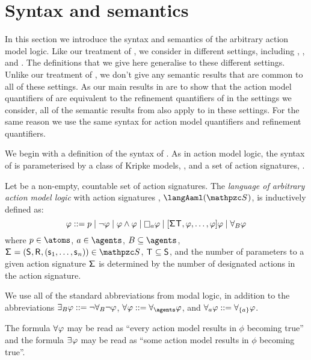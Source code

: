 \section{Syntax and semantics}\label{aaml-semantics}

In this section we introduce the syntax and semantics of the arbitrary action model logic.
Like our treatment of \logicRml{}, we consider \logicAaml{} in different settings, including \classK{}, \classKFF{}, and \classS{}.
The definitions that we give here generalise to these different settings.
Unlike our treatment of \logicRml{}, we don't give any semantic results that are common to all of these settings.
As our main results in \logicAaml{} are to show that the action model quantifiers of \logicAaml{} are equivalent to the refinement quantifiers of \logicRml{} in the settings we consider, all of the semantic results from \logicRml{} also apply to \logicAaml{} in these settings.
For the same reason we use the same syntax for action model quantifiers and refinement quantifiers.

We begin with a definition of the syntax of \logicAaml{}.
As in action model logic, the syntax of \logicAaml{} is parameterised by a class of Kripke models, \classC{}, and a set of action signatures, \aSignatureFamily{}.

\begin{definition}
Let \aSignatureFamily{} be a non-empty, countable set of action signatures.
The {\em language of arbitrary action model logic} with action signatures \aSignatureFamily{}, $\langAaml(\aSignatureFamily)$, is inductively defined as:
$$
\phi ::= 
    \atomP \mid
    \lnot \phi \mid
    \phi \land \phi \mid
    \necessaryA \phi \mid
    \actionA{\aSignature \aStatesT, \phi, \dots, \phi} \phi \mid
    \allactsBs \phi
$$
where $\atomP \in \atoms$, $\agentA \in \agents$, $\agentsB \subseteq \agents$, $\aSignatureAndTuple \in \aSignatureFamily$, $\aStatesT \subseteq \aStates$, and the number of parameters to a given action signature $\aSignature$ is determined by the number of designated actions in the action signature.
\end{definition}

We use all of the standard abbreviations from modal logic, in addition to the abbreviations $\somerefsBs \phi ::= \lnot \allrefsBs \lnot \phi$, $\allrefs \phi ::= \allrefsAs \phi$, and $\allrefsA \phi ::= \allrefs[\{\agentA\}] \phi$.

The formula $\allacts \phi$ may be read as ``every action model results in $\phi$ becoming true'' and the formula $\someacts \phi$ may be read as ``some action model results in $\phi$ becoming true''.

